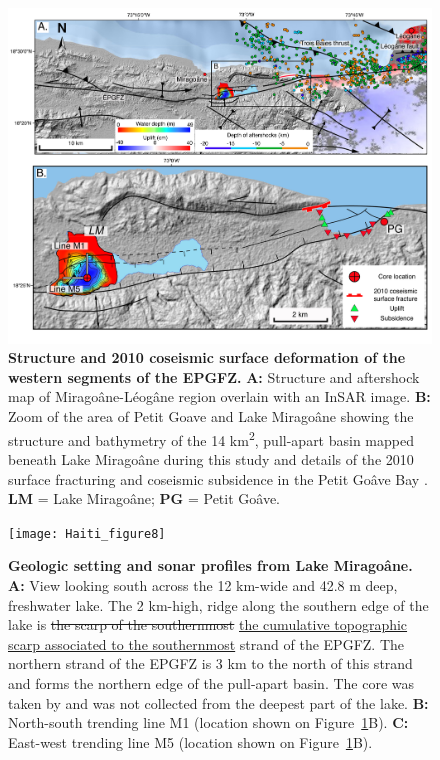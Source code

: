 \documentclass[linenumbers,draft]{agujournal}
\providecommand{\DIFdel}[1]{{\protect\color{red}\sout{#1}}}                      %
\providecommand{\DIFdelFL}[1]{\DIFdel{#1}} %
\providecommand{\DIFaddbeginFL}{} %
\providecommand{\DIFaddendFL}{} %
\providecommand{\DIFdelbeginFL}{} %
\providecommand{\DIFdelendFL}{} %
\begin{document}
\begin{figure}
\centering
\includegraphics[width=\textwidth]{Haiti_figure7}
\caption{\textbf{Structure and 2010 coseismic surface deformation of the western segments of the EPGFZ.} \textbf{A:} Structure \citep{prentice2010seismic} and aftershock \citep{douilly2015three} map of Mirago\^ane-L\'eog\^ane region overlain with an InSAR image. \textbf{B:} Zoom of the area of Petit Goave and Lake Mirago\^ane showing the structure and bathymetry of the 14 km\textsuperscript{2}, pull-apart basin mapped beneath Lake Mirago\^ane during this study and details of the 2010 surface fracturing and coseismic subsidence in the Petit Go\^ave Bay \citep{prentice2010seismic}. \textbf{LM} = Lake Mirago\^ane; \textbf{PG} = Petit Go\^ave.}
\label{figure7}
\end{figure}

\begin{figure}
\centering
\texttt{[image: Haiti\_figure8]}
\caption{\textbf{Geologic setting and sonar profiles from Lake Mirago\^ane.} \textbf{A:} View looking south across the 12 km-wide and 42.8 m deep, freshwater lake. The 2 km-high, ridge along the southern edge of the lake is \DIFdelbeginFL \DIFdelFL{the scarp of the southernmost }\DIFdelendFL \DIFaddbeginFL \ul{the cumulative topographic scarp associated to the southernmost} \DIFaddendFL strand of the EPGFZ. The northern strand of the EPGFZ is 3 km to the north of this strand and forms the northern edge of the pull-apart basin. The core was taken by \citet{higuera199910} and was not collected from the deepest part of the lake. \textbf{B:} North-south trending line M1 (location shown on Figure~\ref{figure7}B). \textbf{C:} East-west trending line M5 (location shown on Figure~\ref{figure7}B).}
\label{figure8}
\end{figure}
\end{document}
